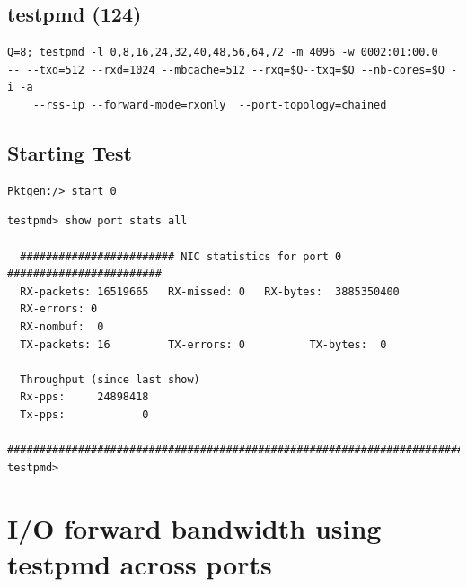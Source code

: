 \documentclass[letter]{article}
\begin{document}
{{\subsection{testpmd (124)}

\begin{lstlisting}[escapechar=!]
Q=8; testpmd -l 0,8,16,24,32,40,48,56,64,72 -m 4096 -w 0002:01:00.0 
-- --txd=512 --rxd=1024 --mbcache=512 --rxq=$Q--txq=$Q --nb-cores=$Q -i -a 
	--rss-ip --forward-mode=rxonly  --port-topology=chained
\end{lstlisting}

\subsection{Starting Test}

\begin{lstlisting}[escapechar=!]
Pktgen:/> start 0
\end{lstlisting}

\begin{lstlisting}
testpmd> show port stats all

  ######################## NIC statistics for port 0  ########################
  RX-packets: 16519665   RX-missed: 0   RX-bytes:  3885350400
  RX-errors: 0
  RX-nombuf:  0         
  TX-packets: 16         TX-errors: 0          TX-bytes:  0

  Throughput (since last show)
  Rx-pps:     24898418
  Tx-pps:            0
  ############################################################################
testpmd> 
\end{lstlisting}

\section{I/O forward bandwidth using testpmd across ports}


}}
\end{document}
